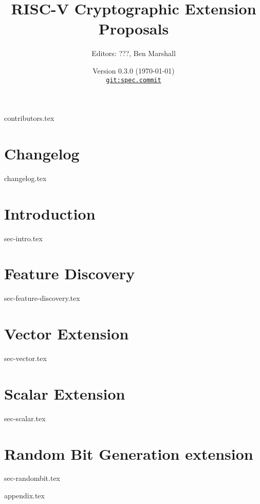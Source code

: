 \documentclass[11pt]{article}
\title{RISC-V Cryptographic Extension Proposals}
\author{Editors: ???, Ben Marshall}
\date{Version $0.3.0$ (\today) \\
\href{https://github.com/scarv/riscv-crypto}{
{\small \tt git:{spec.commit}}}
}
\begin{document}

\maketitle

{contributors.tex}

\tableofcontents


\newpage
\section{Changelog}
\label{sec:changelog}
{changelog.tex}


\newpage
\section{Introduction}
\label{sec:intro}
{sec-intro.tex}

\newpage
\section{Feature Discovery}
\label{sec:feature-discovery}
{sec-feature-discovery.tex}

\newpage
\section{Vector Extension}
\label{sec:vector}
{sec-vector.tex}

\newpage
\section{Scalar Extension}
\label{sec:scalar}
{sec-scalar.tex}

\newpage
\section{Random Bit Generation extension}
\label{sec:randombit}
{sec-randombit.tex}


\newpage
\printbibliography


%
%

\newpage
\begin{appendices}
\label{sec:appendix}
{appendix.tex}
\end{appendices}

\end{document}
